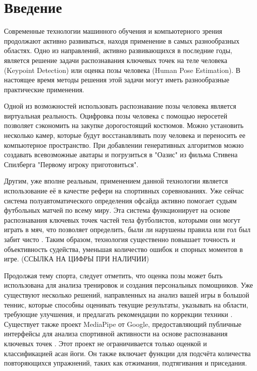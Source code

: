 \section{Введение}
\label{sec:Chapter0} 


Современные технологии машинного обучения и компьютерного зрения продолжают активно развиваться, находя применение в самых разнообразных областях. Одно из направлений, активно развивающихся в последние годы, является решение задачи распознавания ключевых точек на теле человека (Keypoint Detection) или оценка позы человека (Human Pose Estimation). В настоящее время методы решения этой задачи могут иметь разнообразные практические применения.

Одной из возможностей использовать распознавание позы человека является виртуальная реальность. Оцифровка позы человека с помощью неросетей позволяет сэкономить на закупке дорогостоящий костюмов. Можно установить несколько камер, которые будут восстанавливать позу человека и переносить ее компьютерное пространство. При добавлении генеративных алгоритмов можно создавать всевозможные аватары и погрузиться в "Оазис" из фильма Стивена Спилберга "Первому игроку приготовиться".

Другим, уже вполне реальным, применением данной технологии является использование её в качестве рефери на спортивных соревнованиях. Уже сейчас система полуавтоматического определения офсайда активно помогает судьям футбольных матчей по всему миру. Эта система функционирует на основе распознавания ключевых точек частей тела футболистов, которыми они могут играть в мяч, что позволяет определить, были ли нарушены правила или гол был забит чисто \cite{fifaOffside}. Таким образом, технология существенно повышает точность и объективность судейства, уменьшая количество ошибок и спорных моментов в игре. (ССЫЛКА НА ЦИФРЫ ПРИ НАЛИЧИИ)

Продолжая тему спорта, следует отметить, что оценка позы может быть использована для анализа тренировок и создания персональных помощников. Уже существуют несколько решений, направленных на анализ вашей игры в большой теннис, которые способны оценивать текущие результаты, указывать на области, требующие улучшения, и предлагать рекомендации по коррекции техники \cite{IEEETennis, tennisTrener}. Существует также проект MediaPipe от Google, предоставляющий публичные интерфейсы для анализа спортивной активности на основе распознавания ключевых точек \cite{mediapipe}. Этот проект не ограничивается только оценкой и классификацией асан йоги. Он также включает функции для подсчёта количества повторяющихся упражнений, таких как отжимания, подтягивания и приседания. 

